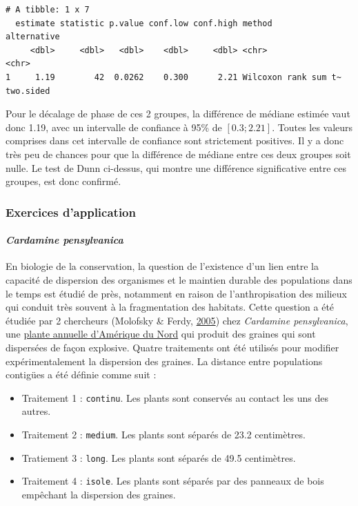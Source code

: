 \documentclass[a4paperpaper,]{article}
\providecommand{\tightlist}{%
  \setlength{\itemsep}{0pt}\setlength{\parskip}{0pt}}
\let\oldparagraph\paragraph
\renewcommand{\paragraph}[1]{\oldparagraph{#1}\mbox{}}
\begin{document}
\begin{verbatim}
# A tibble: 1 x 7
  estimate statistic p.value conf.low conf.high method               alternative
     <dbl>     <dbl>   <dbl>    <dbl>     <dbl> <chr>                <chr>      
1     1.19        42  0.0262    0.300      2.21 Wilcoxon rank sum t~ two.sided  
\end{verbatim}

Pour le décalage de phase de ces 2 groupes, la différence de médiane estimée vaut donc 1.19, avec un intervalle de confiance à 95\% de \([0.3 ; 2.21]\). Toutes les valeurs comprises dans cet intervalle de confiance sont strictement positives. Il y a donc très peu de chances pour que la différence de médiane entre ces deux groupes soit nulle. Le test de Dunn ci-dessus, qui montre une différence significative entre ces groupes, est donc confirmé.

\hypertarget{exercices-dapplication}{%
\subsubsection{Exercices d'application}\label{exercices-dapplication}}

\hypertarget{cardamine-pensylvanica}{%
\paragraph{\texorpdfstring{\emph{Cardamine pensylvanica}}{Cardamine pensylvanica}}\label{cardamine-pensylvanica}}

En biologie de la conservation, la question de l'existence d'un lien entre la capacité de dispersion des organismes et le maintien durable des populations dans le temps est étudié de près, notamment en raison de l'anthropisation des milieux qui conduit très souvent à la fragmentation des habitats. Cette question a été étudiée par 2 chercheurs (Molofsky \& Ferdy, \protect\hyperlink{ref-Molofsky2005}{2005}) chez \emph{Cardamine pensylvanica}, une \href{https://en.wikipedia.org/wiki/Cardamine_pensylvanica}{plante annuelle d'Amérique du Nord} qui produit des graines qui sont dispersées de façon explosive. Quatre traitements ont été utilisés pour modifier expérimentalement la dispersion des graines. La distance entre populations contigües a été définie comme suit :

\begin{itemize}
\tightlist
\item
  Traitement 1 : \texttt{continu}. Les plants sont conservés au contact les uns des autres.
\item
  Traitement 2 : \texttt{medium}. Les plants sont séparés de 23.2 centimètres.
\item
  Tratiement 3 : \texttt{long}. Les plants sont séparés de 49.5 centimètres.
\item
  Traitement 4 : \texttt{isole}. Les plants sont séparés par des panneaux de bois empêchant la dispersion des graines.
\end{itemize}
\end{document}
